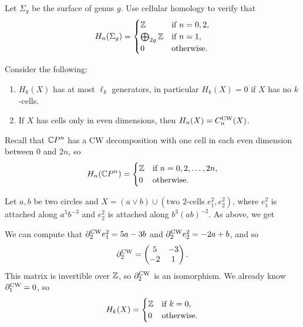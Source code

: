 \begin{exercise}
  Let $\Sigma_g$ be the surface of genus
  $g$. Use cellular homology to verify that
  \[
    H_n(\Sigma_g) =
    \begin{cases}
      \mathbb{Z} & \text{if } n = 0, 2, \\
      \bigoplus_{2g} \mathbb{Z} & \text{if } n = 1, \\
      0 & \text{otherwise}.
    \end{cases}
  \]
\end{exercise}

\begin{remark}
  Consider the following:
  \begin{enumerate}
    \item $H_k(X)$ has at most $\ell_k$ generators,
      in particular $H_k(X) = 0$ if
      $X$ has no $k$-cells.
    \item If $X$ has cells only in even dimensions,
      then $H_n(X) = C_n^{\mathrm{CW}}(X)$.
  \end{enumerate}
\end{remark}

\begin{example}
  Recall that $\mathbb{C} P^n$ has a CW decomposition
  with one cell in each even dimension between
  $0$ and $2n$, so
  \[
    H_n( \mathbb{C} P^n) =
    \begin{cases}
      \mathbb{Z} & \text{if } n = 0, 2, \dots, 2n, \\
      0 & \text{otherwise}.
    \end{cases}
  \]
\end{example}

\begin{example}
  Let $a, b$ be two circles and
  $X = (a \lor b) \cup (\text{two $2$-cells $e_1^2, e_2^2$})$,
  where $e_1^2$ is attached along $a^5 b^{-3}$
  and $e_2^2$ is attached along $b^3(ab)^{-2}$.
  As above, we get
  \begin{center}
  \end{center}
  We can compute that
  $\partial_2^{\mathrm{CW}} e_1^2 = 5a - 3b$ and
  $\partial_2^{\mathrm{CW}} e_2^2 = -2a + b$, and so
  \[
    \partial_2^{\mathrm{CW}} =
    \begin{pmatrix}
      5 & -3 \\
      -2 & 1
    \end{pmatrix}.
  \]
  This matrix is invertible over $\mathbb{Z}$, so
  $\partial_2^{\mathrm{CW}}$ is an isomorphism. We already know
  $\partial_1^{\mathrm{CW}} = 0$, so
  \[
    H_k(X) =
    \begin{cases}
      \mathbb{Z} & \text{if } k = 0, \\
      0 & \text{otherwise}.
    \end{cases}
  \]
\end{example}

